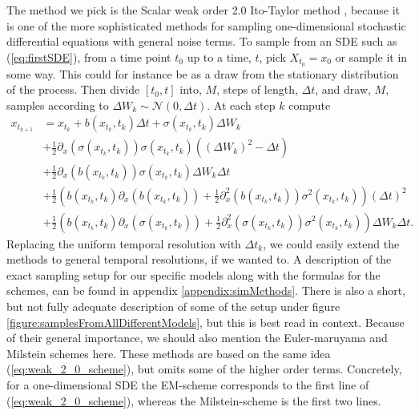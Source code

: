The method we pick is the Scalar weak order 2.0 Ito-Taylor method \cite[Algorithm 8.5]{Srkk2019}, because it is one of the more sophisticated methods for sampling one-dimensional stochastic differential equations with general noise terms. To sample from an SDE such as (\ref{eq:firstSDE}), from a time point $t_0$ up to a time, $t$, pick $X_{t_0} = x_0$ or sample it in some way. This could for instance be as a draw from the stationary distribution of the process. Then divide $[t_0, t]$ into, $M$, steps of length, $\Delta t$, and draw, $M$, samples according to $\Delta W_k\sim\mathcal{N}\left(0, \Delta t\right)$. At each step $k$ compute
\begin{align}
    x_{t_{k + 1}} &= x_{t_{k}} + b(x_{t_{k}}, t_k)\Delta t + \sigma\left(x_{t_{k}}, t_k\right)\Delta W_k \nonumber \\
    &+ \frac{1}{2}\partial_x \left(\sigma\left(x_{t_{k}}, t_k\right)\right)\sigma\left(x_{t_{k}}, t_k\right)\left(\left(\Delta W_k\right)^2 - \Delta t\right) \nonumber \\
    &+ \frac{1}{2}\partial_x \left(b(x_{t_{k}}, t_k)\right)\sigma(x_{t_{k}}, t_k) \Delta W_k\Delta t \nonumber \\
    &+ \frac{1}{2}\left(b(x_{t_{k}}, t_k)\partial_x\left(b(x_{t_{k}}, t_k)\right) + \frac{1}{2}\partial_x^2\left(b\left(x_{t_k}, t_k\right)\right)\sigma^2(x_{t_k}, t_k)\right)\left(\Delta t\right)^2 \nonumber \\
    &+ \frac{1}{2}\left(b(x_{t_{k}}, t_k)\partial_x \left(\sigma(x_{t_{k}}, t_k)\right) + \frac{1}{2}\partial_x^2\left(\sigma(x_{t_k}, t_k)\right)\sigma^2(x_{t_k}, t_k)\right)\Delta W_k\Delta t. \label{eq:weak_2_0_scheme}
\end{align}
Replacing the uniform temporal resolution with $\Delta t_k$, we could easily extend the methods to general temporal resolutions, if we wanted to.
A description of the exact sampling setup for our specific models along with the formulas for the schemes, can be found in appendix \ref{appendix:simMethods}. There is also a short, but not fully adequate description of some of the setup under figure \ref{figure:samplesFromAllDifferentModels}, but this is best read in context. Because of their general importance, we should also mention the Euler-maruyama and Milstein schemes here. These methods are based on the same idea (\ref{eq:weak_2_0_scheme}), but omits some of the higher order terms. Concretely, for a one-dimensional SDE the EM-scheme corresponds to the first line of (\ref{eq:weak_2_0_scheme}), whereas the Milstein-scheme is the first two lines.

